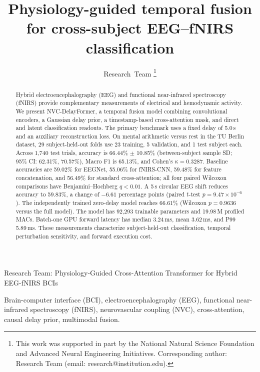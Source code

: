 \documentclass[journal]{IEEEtran}
\begin{document}
\title{Physiology-guided temporal fusion for cross-subject EEG--fNIRS classification}

\author{Research~Team
\thanks{This work was supported in part by the National Natural Science Foundation and Advanced Neural Engineering Initiatives. Corresponding author: Research Team (email: research@institution.edu).}}

%
{Research Team: Physiology-Guided Cross-Attention Transformer for Hybrid EEG-fNIRS BCIs}

\maketitle

\begin{abstract}
Hybrid electroencephalography (EEG) and functional near-infrared spectroscopy (fNIRS) provide complementary measurements of electrical and hemodynamic activity. We present NVC-DelayFormer, a temporal fusion model combining convolutional encoders, a Gaussian delay prior, a timestamp-based cross-attention mask, and direct and latent classification readouts. The primary benchmark uses a fixed delay of 5.0\,s and an auxiliary reconstruction loss. On mental arithmetic versus rest in the TU Berlin dataset, 29 subject-held-out folds use 23 training, 5 validation, and 1 test subject each. Across 1,740 test trials, accuracy is 66.44\% $\pm$ 10.85\% (between-subject sample SD; 95\% CI: 62.31\%, 70.57\%), Macro F1 is 65.13\%, and Cohen's $\kappa=0.3287$. Baseline accuracies are 59.02\% for EEGNet, 55.06\% for fNIRS-CNN, 59.48\% for feature concatenation, and 56.49\% for standard cross-attention; all four paired Wilcoxon comparisons have Benjamini--Hochberg $q<0.01$. A 5\,s circular EEG shift reduces accuracy to 59.83\%, a change of $-6.61$ percentage points (paired $t$-test $p=9.47 \times 10^{-6}$). The independently trained zero-delay model reaches 66.61\% (Wilcoxon $p=0.9636$ versus the full model). The model has 92,293 trainable parameters and 19.98\,M profiled MACs. Batch-one GPU forward latency has median 3.24\,ms, mean 3.62\,ms, and P99 5.89\,ms. These measurements characterize subject-held-out classification, temporal perturbation sensitivity, and forward execution cost.
\end{abstract}

\begin{IEEEkeywords}
Brain-computer interface (BCI), electroencephalography (EEG), functional near-infrared spectroscopy (fNIRS), neurovascular coupling (NVC), cross-attention, causal delay prior, multimodal fusion.
\end{IEEEkeywords}
\end{document}
